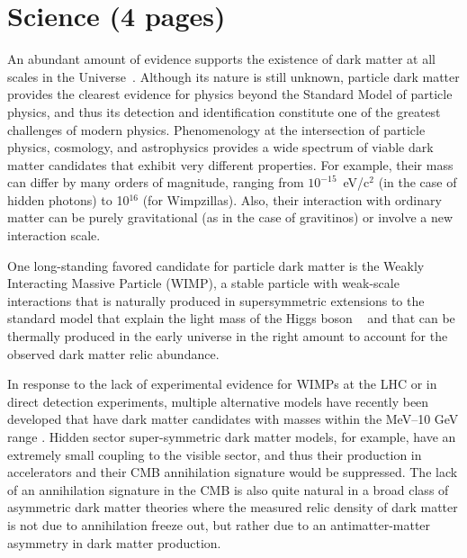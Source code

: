 \section{Science (4 pages)}
\label{sec:science}

An abundant amount of evidence supports the existence of dark matter at all scales in the Universe~\cite{Ade:2013zuv}. Although its nature is still unknown, particle dark matter provides the clearest evidence for physics beyond the Standard Model of particle physics, and thus its detection and identification constitute one of the greatest challenges of modern physics. Phenomenology at the intersection of particle physics, cosmology, and astrophysics provides a wide spectrum of viable dark matter candidates that exhibit very different properties. For example, their mass can differ by many orders of magnitude, ranging from $10^{-15}$~eV/c$^{2}$ (in the case of hidden photons) to 10$^{16}$ \gev (for Wimpzillas). Also, their interaction with ordinary matter can be purely gravitational (as in the case of gravitinos) or involve a new interaction scale.

One long-standing favored candidate for particle dark matter is the Weakly Interacting Massive Particle (WIMP), a stable particle with weak-scale interactions that is naturally produced in supersymmetric extensions to the standard model that explain the light mass of the Higgs boson ~\cite{Jungman:1995df,Ellis:1983ew,Agashe:2004ci, Servant:2002aq,Cheng:2002ej,Schmaltz:2010ac} and that can be thermally produced in the early universe in the right amount to account for the observed dark matter relic abundance.

In response to the lack of experimental evidence for WIMPs at the LHC or in direct detection experiments, multiple alternative models have recently been developed that have dark matter candidates with masses within the MeV--10 GeV range \cite{Kaplan:92prl, Kaplan:09prd, Graham:12pdu, Falkowski:11jhep, Feng:08prl, Hall:10jhep, Essig:12prd}. Hidden sector super-symmetric dark matter models, for example, have an extremely small coupling to the visible sector, and thus their production in accelerators and their CMB annihilation signature would be suppressed.  The lack of an annihilation signature in the CMB is also quite natural in a broad class of asymmetric dark matter theories where the measured relic density of dark matter is not due to annihilation freeze out, but rather due to an antimatter-matter asymmetry in dark matter production.

